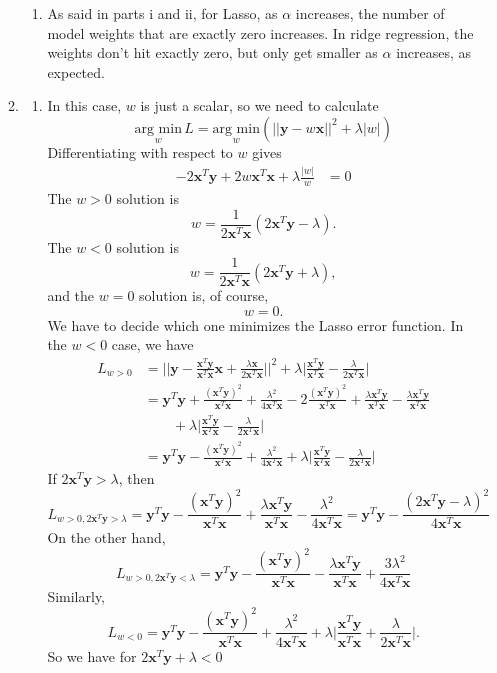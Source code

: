 \documentclass[12pt]{article}
\newcommand{\x}{\mathbf x}
\newcommand{\y}{\mathbf y}
\begin{document}
\begin{enumerate}[leftmargin=*]
\begin{enumerate}[label = \Alph*.]
\begin{enumerate}
\item As said in parts i and ii, for Lasso, as $\alpha$ increases, the number of model weights that are exactly zero increases. In ridge regression, the weights don't hit exactly zero, but only get smaller as $\alpha$ increases, as expected.
\end{enumerate}
\item
\begin{enumerate}
\item In this case, $w$ is just a scalar, so we need to calculate
\[ \underset{w}{\text{arg min}} \, L = \underset{w}{\text{arg min}} \left( || \y - w \x ||^2 + \lambda |w| \right) \]
Differentiating with respect to $w$ gives
\begin{align*}
-2 \x^T \y + 2 w \x^T \x + \lambda \frac{|w|}{w} &= 0
\end{align*}
The $w > 0$ solution is
\[ w = \frac{1}{2 \x^T \x} \left( 2 \x^T \y - \lambda \right). \]
The $w < 0$ solution is
\[ w = \frac{1}{2 \x^T \x} \left( 2 \x^T \y + \lambda \right), \]
and the $w = 0$ solution is, of course,
\[ w = 0. \]
We have to decide which one minimizes the Lasso error function. In the $w < 0$ case, we have
\begin{align*}
L_{w > 0} &= \bigg| \bigg| \y - \frac{\x^T \y}{\x^T \x} \x + \frac{\lambda \x}{2 \x^T \x} \bigg| \bigg|^2 + \lambda \bigg| \frac{\x^T \y}{\x^T \x} - \frac{\lambda}{2 \x^T \x} \bigg| \\
&= \y^T \y + \frac{(\x^T \y)^2}{\x^T \x} + \frac{\lambda^2}{4 \x^T \x} - 2 \frac{(\x^T \y)^2}{\x^T \x} + \frac{\lambda \x^T \y}{\x^T \x} - \frac{\lambda \x^T \y}{\x^T \x} \\
& \qquad + \lambda \bigg| \frac{\x^T \y}{\x^T \x} - \frac{\lambda}{2 \x^T \x} \bigg| \\
&= \y^T \y - \frac{(\x^T \y)^2}{\x^T \x} + \frac{\lambda^2}{4 \x^T \x} + \lambda \bigg| \frac{\x^T \y}{\x^T \x} - \frac{\lambda}{2 \x^T \x} \bigg|
\end{align*}
If $2 \x^T \y > \lambda$, then
\[ L_{w > 0, 2 \x^T \y > \lambda} = \y^T \y - \frac{(\x^T \y)^2}{\x^T \x} + \frac{\lambda \x^T \y}{\x^T \x} - \frac{\lambda^2}{4 \x^T \x} = \y^T \y - \frac{(2 \x^T \y - \lambda)^2}{4 \x^T \x} \]
On the other hand,
\[ L_{w > 0, 2 \x^T \y < \lambda} = \y^T \y - \frac{(\x^T \y)^2}{\x^T \x} - \frac{\lambda \x^T \y}{\x^T \x} + \frac{3\lambda^2}{4 \x^T \x}\]
Similarly,
\[ L_{w < 0} = \y^T \y - \frac{(\x^T \y)^2}{\x^T \x} + \frac{\lambda^2}{4 \x^T \x} + \lambda \bigg| \frac{\x^T \y}{\x^T \x} + \frac{\lambda}{2 \x^T \x} \bigg|. \]
So we have for $2 \x^T \y + \lambda < 0$

\end{enumerate}
\end{enumerate}
\end{enumerate}
\end{document}
